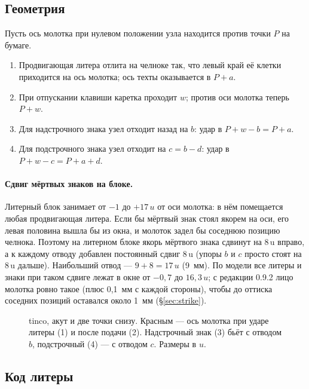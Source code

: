 \subsection{Геометрия}

Пусть ось молотка при нулевом положении узла находится против точки $P$ на бумаге.

\begin{enumerate}
  \item Продвигающая литера отлита на челноке так, что левый край её клетки приходится на ось молотка; ось техты оказывается в $P + a$.
  \item При отпускании клавиши каретка проходит $w$; против оси молотка теперь $P + w$.
  \item Для надстрочного знака узел отходит назад на $b$: удар в $P + w - b = P + a$.
  \item Для подстрочного знака узел отходит на $c = b - d$: удар в $P + w - c = P + a + d$.
\end{enumerate}

\paragraph{Сдвиг мёртвых знаков на блоке.} Литерный блок занимает от $-1$ до $+17\,u$ от оси молотка: в нём помещается любая продвигающая литера. Если бы мёртвый знак стоял якорем на оси, его левая половина вышла бы из окна, и молоток задел бы соседнюю позицию челнока. Поэтому на литерном блоке якорь мёртвого знака сдвинут на 8\,u вправо, а к каждому отводу добавлен постоянный сдвиг 8\,u (упоры $b$ и $c$ просто стоят на 8\,u дальше). Наибольший отвод — $9 + 8 = 17\,u$ (9~мм). По модели все литеры и знаки при таком сдвиге лежат в окне от $-0{,}7$ до $16{,}3\,u$; с редакции 0.9.2 лицо молотка ровно такое (плюс 0,1~мм с каждой стороны), чтобы до оттиска соседних позиций оставался около 1~мм (\S\ref{sec:strike}).

\begin{figure}[h]
\centering
\setlength\tgem{48mm}
\begin{tikzpicture}[x=\tgu,y=\tgu]

\end{tikzpicture}
\caption{tinco, акут и две точки снизу. Красным — ось молотка при ударе литеры (1) и после подачи (2). Надстрочный знак (3) бьёт с отводом $b$, подстрочный (4) — с отводом $c$. Размеры в $u$.}
\label{fig:geom}
\end{figure}

\subsection{Код литеры}

